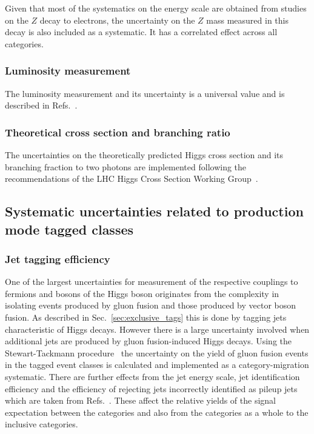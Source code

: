Given that most of the systematics on the energy scale are obtained from studies on the $Z$ decay to electrons, the uncertainty on the $Z$ mass measured in this decay is also included as a systematic. It has a correlated effect across all categories.

\subsubsection{Luminosity measurement}

The luminosity measurement and its uncertainty is a \CMS universal value and is described in Refs.~\cite{lumi1,lumi2}.

\subsubsection{Theoretical cross section and branching ratio}

The uncertainties on the theoretically predicted \SM Higgs cross section and its branching fraction to two photons are implemented following the recommendations of the LHC Higgs Cross Section Working Group~\cite{LHCHiggsCrossSectionWorkingGroup3}. 

\subsection{Systematic uncertainties related to production mode tagged classes}

\subsubsection{Jet tagging efficiency}

One of the largest uncertainties for measurement of the respective couplings to fermions and bosons of the Higgs boson originates from the complexity in isolating events produced by gluon fusion and those produced by vector boson fusion. As described in Sec.~\ref{sec:exclusive_tags} this is done by tagging jets characteristic of \VBF Higgs decays. However there is a large uncertainty involved when additional jets are produced by gluon fusion-induced Higgs decays. Using the Stewart-Tackmann procedure~\cite{vbf_syst} the uncertainty on the yield of gluon fusion events in the \VBF tagged event classes is calculated and implemented as a category-migration systematic. There are further effects from the jet energy scale, jet identification efficiency and the efficiency of rejecting jets incorrectly identified as pileup jets which are taken from Refs.~\cite{jet_energy_corrections,jet_energy_corrs2}. These affect the relative yields of the signal expectation between the \VBF categories and also from the \VBF categories as a whole to the inclusive categories.  

